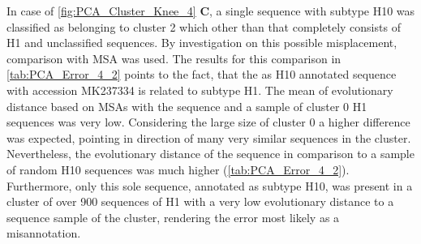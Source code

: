 \begin{table}[!hbt]
    \centering
    \caption[Anomalies in segment 4 cluster 48 with PK]{\textbf{Anomalies in segment 4 cluster 48 with PK.} The \glspl{MSA} mean distance of the given sequences in comparison to a sample of H16 sequences of the same cluster and a sample of H13 sequences present in another cluster. Only the first 20 columns are presented here, the full table can be found in the projects GitHub Repository\footnotemark.}
    \label{tab:PCA_Error_4_48}
\end{table}

\vspace{1em}

In case of \autoref{fig:PCA_Cluster_Knee_4} \textbf{\textsf{C}}, a single sequence with subtype H10 was classified as belonging to cluster 2 which other than that completely consists of H1 and unclassified sequences. By investigation on this possible misplacement, comparison with \gls{MSA} was used. The results for this comparison in \autoref{tab:PCA_Error_4_2} points to the fact, that the as H10 annotated sequence with accession MK237334 is related to subtype H1. The mean of evolutionary distance based on \glspl{MSA} with the sequence and a sample of cluster 0 H1 sequences was very low. Considering the large size of cluster 0 a higher difference was expected, pointing in direction of many very similar sequences in the cluster. Nevertheless, the evolutionary distance of the sequence in comparison to a sample of random H10 sequences was much higher (\autoref{tab:PCA_Error_4_2}).%
Furthermore, only this sole sequence, annotated as subtype H10, was present in a cluster of over 900 sequences of H1 with a very low evolutionary distance to a sequence sample of the cluster, rendering the error most likely as a misannotation.

